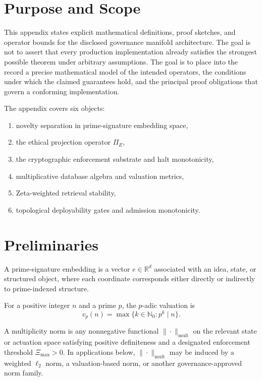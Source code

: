 \documentclass[11pt]{article}
\begin{document}
\appendix
\section{Purpose and Scope}
This appendix states explicit mathematical definitions, proof sketches, and operator bounds for the disclosed governance manifold architecture. The goal is not to assert that every production implementation already satisfies the strongest possible theorem under arbitrary assumptions. The goal is to place into the record a precise mathematical model of the intended operators, the conditions under which the claimed guarantees hold, and the principal proof obligations that govern a conforming implementation.

The appendix covers six objects:
\begin{enumerate}[leftmargin=1.3cm]
  \item novelty separation in prime-signature embedding space,
  \item the ethical projection operator \(\Pi_E\),
  \item the cryptographic enforcement substrate and halt monotonicity,
  \item multiplicative database algebra and valuation metrics,
  \item Zeta-weighted retrieval stability,
  \item topological deployability gates and admission monotonicity.
\end{enumerate}

\section{Preliminaries}
\begin{definition}
A prime-signature embedding is a vector \(e \in \mathbb{R}^d\) associated with an idea, state, or structured object, where each coordinate corresponds either directly or indirectly to prime-indexed structure.
\end{definition}

\begin{definition}[Valuation]
For a positive integer \(n\) and a prime \(p\), the \(p\)-adic valuation is
\[
v_p(n) = \max\{k \in \mathbb{N}_0 : p^k \mid n\}. \tag{A1}
\]
\end{definition}

\begin{definition}
A multiplicity norm is any nonnegative functional \(\|\cdot\|_{\mathrm{mult}}\) on the relevant state or actuation space satisfying positive definiteness and a designated enforcement threshold \(\Xi_{\max} > 0\). In applications below, \(\|\cdot\|_{\mathrm{mult}}\) may be induced by a weighted \(\ell_2\) norm, a valuation-based norm, or another governance-approved norm family.
\end{definition}
\end{document}
